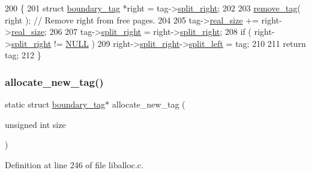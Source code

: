 \begin{DoxyCode}
200 \{
201     \textcolor{keyword}{struct }\hyperlink{a00126}{boundary\_tag} *right = tag->\hyperlink{a00126_a9d43c9c4ff5ae35908dcfed0aec1907a_a9d43c9c4ff5ae35908dcfed0aec1907a}{split\_right};
202 
203         \hyperlink{a00035_aeea23ead928f2a5d40fdf7687b3c99c9_aeea23ead928f2a5d40fdf7687b3c99c9}{remove\_tag}( right );      \textcolor{comment}{// Remove right from free pages.}
204 
205         tag->\hyperlink{a00126_ad22b1c69bdce419783ac165f7f354245_ad22b1c69bdce419783ac165f7f354245}{real\_size}   += right->\hyperlink{a00126_ad22b1c69bdce419783ac165f7f354245_ad22b1c69bdce419783ac165f7f354245}{real\_size};
206 
207         tag->\hyperlink{a00126_a9d43c9c4ff5ae35908dcfed0aec1907a_a9d43c9c4ff5ae35908dcfed0aec1907a}{split\_right}  = right->\hyperlink{a00126_a9d43c9c4ff5ae35908dcfed0aec1907a_a9d43c9c4ff5ae35908dcfed0aec1907a}{split\_right};
208         \textcolor{keywordflow}{if} ( right->\hyperlink{a00126_a9d43c9c4ff5ae35908dcfed0aec1907a_a9d43c9c4ff5ae35908dcfed0aec1907a}{split\_right} != \hyperlink{a00038_a070d2ce7b6bb7e5c05602aa8c308d0c4_a070d2ce7b6bb7e5c05602aa8c308d0c4}{NULL} )
209                     right->\hyperlink{a00126_a9d43c9c4ff5ae35908dcfed0aec1907a_a9d43c9c4ff5ae35908dcfed0aec1907a}{split\_right}->\hyperlink{a00126_a4daa8c3768359ea8d0f46ef907616cc2_a4daa8c3768359ea8d0f46ef907616cc2}{split\_left} = tag;
210 
211     \textcolor{keywordflow}{return} tag;
212 \}
\end{DoxyCode}
\mbox{\label{a00035_a8e465ea231c950756bcd4e41244c61a1_a8e465ea231c950756bcd4e41244c61a1}} 
\subsubsection{\texorpdfstring{allocate\+\_\+new\+\_\+tag()}{allocate\_new\_tag()}}
{\footnotesize\ttfamily static struct \hyperlink{a00126}{boundary\+\_\+tag}$\ast$ allocate\+\_\+new\+\_\+tag (\begin{DoxyParamCaption}\item[{unsigned int}]{size }\end{DoxyParamCaption})\hspace{0.3cm}{\ttfamily [static]}}



Definition at line 246 of file liballoc.\+c.


